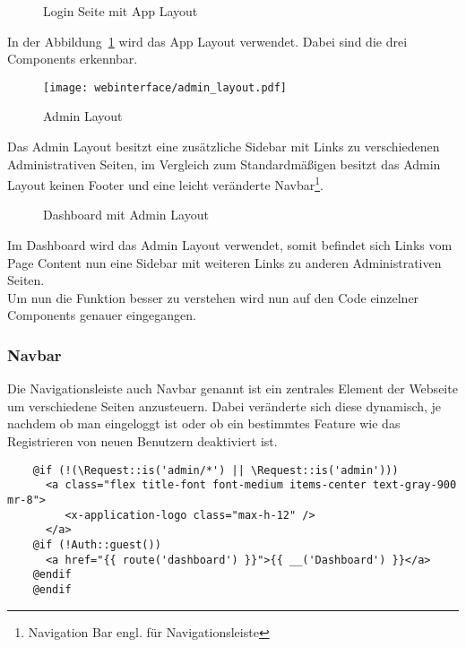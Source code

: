 \begin{figure}[H]
  \centering
  \caption{Login Seite mit App Layout}
  \label{fig:login_site}
\end{figure}

In der Abbildung~\ref{fig:login_site} wird das App Layout verwendet. Dabei sind
die drei Components erkennbar.

\begin{figure}[H]
  \centering
  \texttt{[image: webinterface/admin\_layout.pdf]}
  \caption{Admin Layout}
\end{figure}

Das Admin Layout besitzt eine zusätzliche Sidebar mit Links zu verschiedenen
Administrativen Seiten, im Vergleich zum Standardmäßigen besitzt das Admin
Layout keinen Footer und eine leicht veränderte Navbar\footnote{Navigation Bar
engl. für Navigationsleiste}.

\begin{figure}[H]
  \centering
  \caption{Dashboard mit Admin Layout}
\end{figure}

Im Dashboard wird das Admin Layout verwendet, somit befindet sich Links vom Page
Content nun eine Sidebar mit weiteren Links zu anderen Administrativen Seiten.\\

Um nun die Funktion besser zu verstehen wird nun auf den Code einzelner
Components genauer eingegangen.

\subsubsection{Navbar}
Die Navigationsleiste auch Navbar genannt ist ein zentrales Element der Webseite
um verschiedene Seiten anzusteuern. Dabei veränderte sich diese dynamisch, je
nachdem ob man eingeloggt ist oder ob ein bestimmtes Feature wie das
Registrieren von neuen Benutzern deaktiviert ist.

\begin{listing}[H]
  \begin{verbatim}
    @if (!(\Request::is('admin/*') || \Request::is('admin')))
      <a class="flex title-font font-medium items-center text-gray-900 mr-8">
         <x-application-logo class="max-h-12" />
      </a>
    @if (!Auth::guest())
      <a href="{{ route('dashboard') }}">{{ __('Dashboard') }}</a>
    @endif
    @endif
  \end{verbatim}
  \caption{Ausschnitt 1 navigation.blade.php}
\end{listing}

